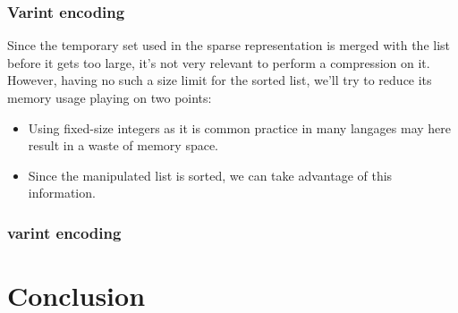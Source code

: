 \documentclass{article}
\begin{document}
\subsubsection{Varint encoding}
Since the temporary set used in the sparse representation is merged
with the list before it gets too large, it's not very relevant to
perform a compression on it. However, having no such a size limit for
the sorted list, we'll try to reduce its memory usage playing on two
points:
\begin{itemize}
\item Using fixed-size integers as it is common practice in many
  langages may here result in a waste of memory space.
\item Since the manipulated list is sorted, we can take advantage of
  this information.
\end{itemize}
\subsubsection{varint encoding}
\section{Conclusion}
\end{document}
